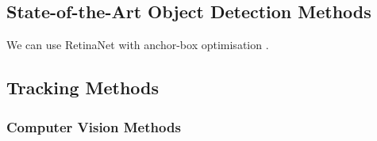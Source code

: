 
\subsection{State-of-the-Art Object Detection Methods}




We can use RetinaNet with anchor-box optimisation \cite{zlocha2019improving}.

\subsection{Tracking Methods}



\subsubsection{Computer Vision Methods}

